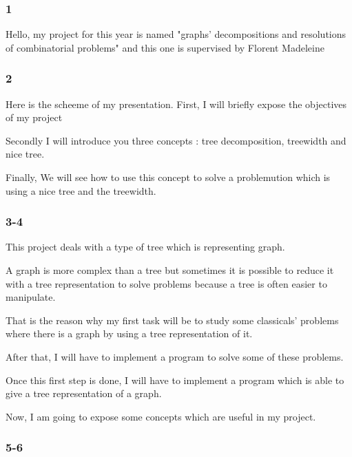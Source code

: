\documentclass[a4paper, 10pt,french,landscape]{article}
\begin{document}
\begin{multicols}{3}

\subsubsection*{ 1 }

Hello,
my project for this year is named "graphs' decompositions and resolutions of combinatorial problems" 
and this one is supervised by Florent Madeleine

\subsubsection*{ 2}

Here is the scheeme of my presentation. 
First, I will briefly expose the objectives of my project

Secondly I will introduce you three concepts : tree decomposition, treewidth and nice tree.

Finally, We will see how to use this concept to solve a problemution which is using a nice tree and the treewidth.


\subsubsection*{ 3-4}





This project deals with a type of tree which is representing graph.

 A graph is more complex than a tree but sometimes it is possible to reduce it with a tree representation to solve problems because a tree is often easier to manipulate.

That is the reason why my first task will be to study some classicals' problems where there is a graph by using a tree representation of it.

After that, I will have to implement a program to solve some of these problems.

Once this first step is done, I will have to implement a program which is able to give a tree representation of a graph.

Now, I am going to expose some concepts which are useful in my project.



\subsubsection*{ 5-6}





\end{multicols}
\end{document}
